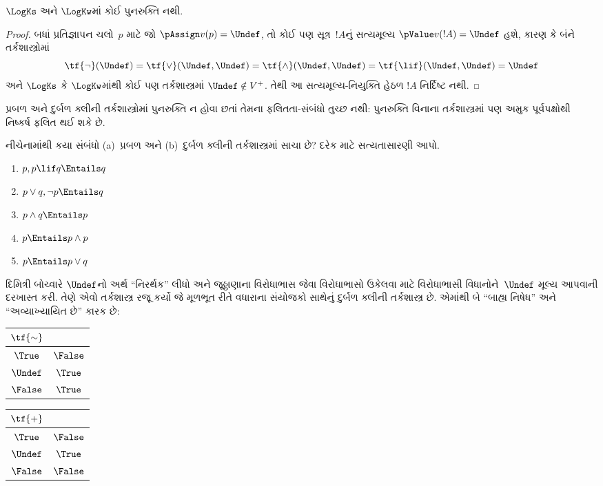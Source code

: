 \begin{prop}
  $\LogKs$ અને $\LogKw$માં કોઈ પુનરુક્તિ નથી.
\end{prop}

\begin{proof}
  બધાં પ્રતિજ્ઞાપન ચલો~$p$ માટે જો
  $\pAssign v(p) = \Undef$, તો કોઈ પણ સૂત્ર~$!A$નું સત્યમૂલ્ય
  $\pValue v(!A) = \Undef$ હશે, કારણ કે બંને તર્કશાસ્ત્રોમાં
  \[
    \tf{\lnot}(\Undef) = \tf{\lor}(\Undef, \Undef) = \tf{\land}(\Undef,
  \Undef) = \tf{\lif}(\Undef, \Undef) = \Undef
  \]
  અને $\LogKs$ કે $\LogKw$માંથી કોઈ પણ તર્કશાસ્ત્રમાં
  $\Undef \notin V^+$.
  તેથી આ સત્યમૂલ્ય-નિયુક્તિ હેઠળ $!A$ નિર્દિષ્ટ નથી.
\end{proof}

પ્રબળ અને દુર્બળ ક્લીની તર્કશાસ્ત્રોમાં પુનરુક્તિ ન હોવા છતાં
તેમના ફલિતતા-સંબંધો તુચ્છ નથી: પુનરુક્તિ વિનાના
તર્કશાસ્ત્રમાં પણ અમુક પૂર્વપક્ષોથી નિષ્કર્ષ ફલિત થઈ શકે છે.

\begin{prob}
  નીચેનામાંથી કયા સંબંધો (a)~પ્રબળ અને (b)~દુર્બળ ક્લીની
  તર્કશાસ્ત્રમાં સાચા છે? દરેક માટે સત્યતાસારણી આપો.
  \begin{enumerate}
    \item $p, p \lif q \Entails q$
    \item $p \lor q, \lnot p \Entails q$
    \item $p \land q \Entails p$
    \item $p \Entails p \land p$
    \item $p \Entails p \lor q$
  \end{enumerate}
\end{prob}

દિમિત્રી બોચ્વારે $\Undef$નો અર્થ ``નિરર્થક'' લીધો અને
જૂઠ્ઠાણાના વિરોધાભાસ જેવા વિરોધાભાસો ઉકેલવા માટે વિરોધાભાસી
વિધાનોને~$\Undef$ મૂલ્ય આપવાની દરખાસ્ત કરી. તેણે એવો તર્કશાસ્ત્ર
રજૂ કર્યો જે મૂળભૂત રીતે વધારાના સંયોજકો સાથેનું દુર્બળ ક્લીની
તર્કશાસ્ત્ર છે. એમાંથી બે ``બાહ્ય નિષેધ'' અને ``અવ્યાખ્યાયિત છે''
કારક છે:
\begin{center}
  \begin{tabular}{c|c}
    $\tf{\sim}$ & \\
    \hline
    $\True$ & $\False$ \\
    $\Undef$ & $\True$ \\
    $\False$ & $\True$
  \end{tabular}
\quad
  \begin{tabular}{c|c}
    $\tf{+}$ & \\
    \hline
    $\True$ & $\False$ \\
    $\Undef$ & $\True$ \\
    $\False$ & $\False$
  \end{tabular}
\end{center}


